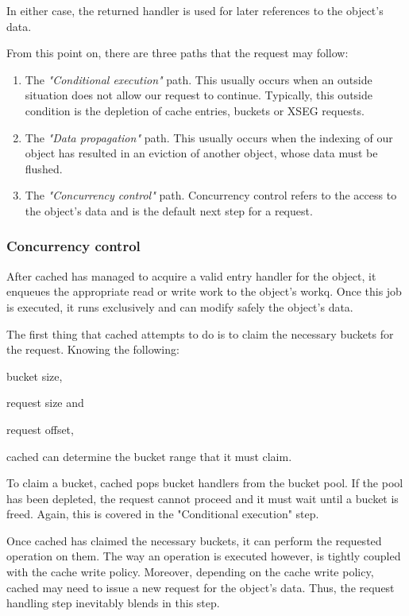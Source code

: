In either case, the returned handler is used for later references to the 
object's data.

From this point on, there are three paths that the request may follow:

\begin{enumerate}
	\item The \textit{"Conditional execution"} path. This usually occurs 
		when an outside situation does not allow our request to 
		continue. Typically, this outside condition is the depletion of 
		cache entries, buckets or XSEG requests.
	\item The \textit{"Data propagation"} path. This usually occurs when 
		the indexing of our object has resulted in an eviction of 
		another object, whose data must be flushed.
	\item The \textit{"Concurrency control"} path. Concurrency control 
		refers to the access to the object's data and is the default 
		next step for a request.
\end{enumerate}

\subsubsection{Concurrency control}

After cached has managed to acquire a valid entry handler for the object, it 
enqueues the appropriate read or write work to the object's workq.  Once this 
job is executed, it runs exclusively and can modify safely the object's data.

The first thing that cached attempts to do is to claim the necessary buckets 
for the request. Knowing the following:
\begin{inparaenum}[(i)]
\item bucket size,
\item request size and
\item request offset,
\end{inparaenum}
cached can determine the bucket range that it must claim.

To claim a bucket, cached pops bucket handlers from the bucket pool. If the 
pool has been depleted, the request cannot proceed and it must wait until a
bucket is freed. Again, this is covered in the "Conditional execution" step.

Once cached has claimed the necessary buckets, it can perform the requested 
operation on them. The way an operation is executed however, is tightly coupled 
with the cache write policy. Moreover, depending on the cache write policy, 
cached may need to issue a new request for the object's data. Thus, the request 
handling step inevitably blends in this step.

